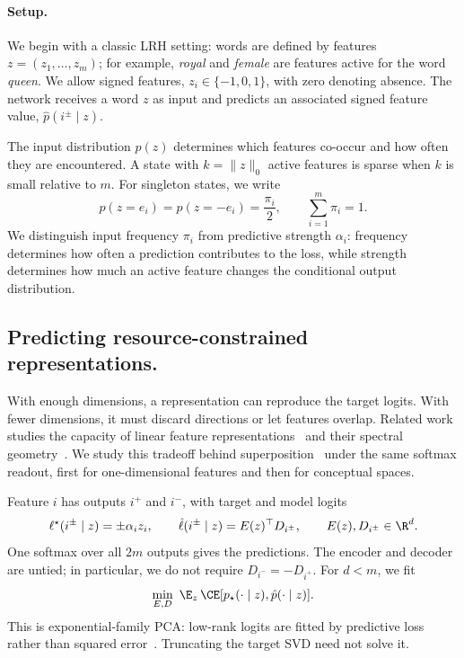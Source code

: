 \paragraph{Setup.}
We begin with a classic LRH setting: words are defined by features
$z=(z_1,\ldots,z_m)$; for example, \emph{royal} and \emph{female}
are features active for the word \emph{queen}. We allow signed
features, $z_i\in\{-1,0,1\}$, with zero denoting absence. The network
receives a word $z$ as input and predicts an associated signed
feature value, $\hat p(i^\pm\mid z)$.

The input distribution $p(z)$ determines which features co-occur
and how often they are encountered. A state with $k=\|z\|_0$ active
features is sparse when $k$ is small relative to $m$. For singleton
states, we write
\begin{equation}
p(z=e_i)=p(z=-e_i)=\frac{\pi_i}{2},
\qquad
\sum_{i=1}^m\pi_i=1.
\label{eq:frequency}
\end{equation}
We distinguish input frequency $\pi_i$ from predictive strength
$\alpha_i$: frequency determines how often a prediction contributes
to the loss, while strength determines how much an active feature
changes the conditional output distribution.

\subsection{Predicting resource-constrained representations.}

With enough dimensions, a representation can reproduce the target
logits. With fewer dimensions, it must discard directions or let
features overlap. Related work studies the capacity of linear
feature representations~\cite{garg} and their spectral
geometry~\cite{spectral}. We study this tradeoff behind
superposition~\cite{elhage} under the same softmax readout, first
for one-dimensional features and then for conceptual spaces.

Feature $i$ has outputs $i^+$ and $i^-$, with target and model logits
\begin{equation}
\ell^\star(i^\pm\mid z)=\pm\alpha_i z_i,
\qquad
\hat\ell(i^\pm\mid z)=E(z)^\top D_{i^\pm},
\qquad
E(z),D_{i^\pm}\in\R^d.
\label{eq:model}
\end{equation}
One softmax over all $2m$ outputs gives the predictions. The encoder
and decoder are untied; in particular, we do not require
$D_{i^-}=-D_{i^+}$. For $d<m$, we fit
\begin{equation}
\min_{E,D}\ \E_z\,
\CE[p_\star(\cdot\mid z),\hat p(\cdot\mid z)].
\label{eq:objective}
\end{equation}
This is exponential-family PCA: low-rank logits are fitted by
predictive loss rather than squared error~\cite{collins}.
Truncating the target SVD need not solve it.

